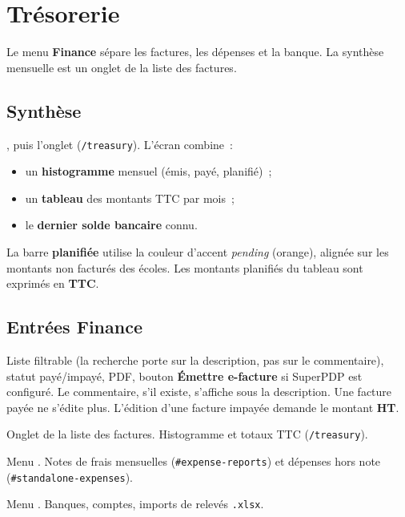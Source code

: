 \chapter{Trésorerie}
\label{ch:tresorerie}

Le menu \textbf{Finance} sépare les factures, les dépenses et la banque. La synthèse mensuelle est un onglet de la liste des factures.

\section{Synthèse}

, puis l'onglet  (\texttt{/treasury}). L'écran combine~:

\begin{itemize}[leftmargin=*]
  \item un \textbf{histogramme} mensuel (émis, payé, planifié)~;
  \item un \textbf{tableau} des montants TTC par mois~;
  \item le \textbf{dernier solde bancaire} connu.
\end{itemize}


La barre \textbf{planifiée} utilise la couleur d'accent \emph{pending} (orange), alignée sur les montants non facturés des écoles. Les montants planifiés du tableau sont exprimés en \textbf{TTC}.

\section{Entrées Finance}

\begin{description}[style=nextline, leftmargin=2.5cm]
  \item[Factures] Liste filtrable (la recherche porte sur la description, pas sur le commentaire), statut payé/impayé, PDF, bouton \textbf{Émettre e-facture} si SuperPDP est configuré. Le commentaire, s'il existe, s'affiche sous la description. Une facture payée ne s'édite plus. L'édition d'une facture impayée demande le montant \textbf{HT}.
  \item[Synthèse] Onglet de la liste des factures. Histogramme et totaux TTC (\texttt{/treasury}).
  \item[Dépenses] Menu . Notes de frais mensuelles (\texttt{\#expense-reports}) et dépenses hors note (\texttt{\#standalone-expenses}).
  \item[Banque] Menu . Banques, comptes, imports de relevés \texttt{.xlsx}.
\end{description}

